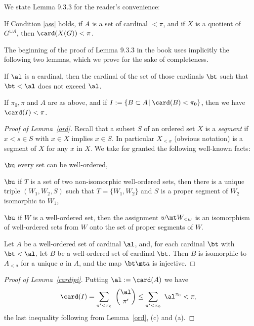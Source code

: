 \documentclass[12pt]{article}
\theoremstyle{remark}
\theoremstyle{definition}
\begin{document}
We state Lemma 9.3.3 for the reader's convenience:

\begin{lem}[Lemma 9.3.3 p.~226]
If Condition \ref{ass} holds, if $A$ is a set of cardinal $<\pi$, and if $X$ is a quotient of $G^{\sqcup A}$, then $\card(X(G))<\pi$.
\end{lem}

The beginning of the proof of Lemma 9.3.3 in the book uses implicitly the following two lemmas, which we prove for the sake of completeness. 

\begin{lem}
If $\al$ is a cardinal, then the cardinal of the set of those cardinals $\bt$ such that $\bt<\al$ does not exceed $\al$.
\end{lem} 

\begin{lem}
If $\pi_0,\pi$ and $A$ are as above, and if $I:=\{B\subset A\,|\,\card(B)<\pi_0\}$, then we have $\card(I)<\pi$. 
\end{lem} 

\begin{proof}[Proof of Lemma~\ref{ord}]
Recall that a subset $S$ of an ordered set $X$ is a {\em segment} if $x<s\in S$ with $x\in X$ implies $x\in S$. In particular $X_{<x}$ (obvious notation) is a segment of $X$ for any $x$ in $X$. We take for granted the following well-known facts:

\nn$\bu$ every set can be well-ordered,

\nn$\bu$ if $T$ is a set of two non-isomorphic well-ordered sets, then there is a unique triple $(W_1,W_2,S)$ such that $T=\{W_1,W_2\}$ and $S$ is a proper segment of $W_2$ isomorphic to $W_1$,

\nn$\bu$ if $W$ is a well-ordered set, then the assignment $w\mt W_{<w}$ is an isomorphism of well-ordered sets from $W$ onto the set of proper segments of $W$.

Let $A$ be a well-ordered set of cardinal $\al$, and, for each cardinal $\bt$ with $\bt<\al$, let $B$ be a well-ordered set of cardinal $\bt$. Then $B$ is isomorphic to $A_{<a}$ for a unique $a$ in $A$, and the map $\bt\mt a$ is injective.
\end{proof} 

\begin{proof}[Proof of Lemma~\ref{cardipi}] 
Putting $\al:=\card(A)$ we have
$$
\card(I)=\sum_{\pi'<\pi_0}\ \binom{\al}{\pi'}\le\sum_{\pi'<\pi_0}\ \al^{\pi_0}<\pi,
$$ 
the last inequality following from Lemma~\ref{ord}, (c) and (a). 
\end{proof} 
\end{document}

